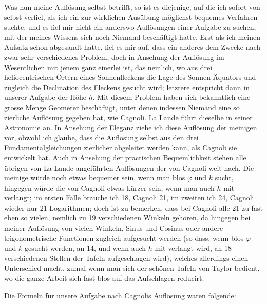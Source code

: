 \documentclass[10pt,a4paper]{article}
\begin{document}
Was nun meine Auflösung selbst betrifft, so ist es diejenige, auf die ich sofort von selbst verfiel, als ich ein zur wirklichen Ausübung möglichst bequemes Verfahren suchte, und es fiel mir nicht ein anderswo Auflösungen einer Aufgabe zu suchen, mit der meines Wissens sich noch Niemand beschäftigt hatte. Erst als ich meinen Aufsatz schon abgesandt hatte, fiel es mir auf, dass ein anderes dem Zwecke nach zwar sehr verschiedenes Problem, doch in Ansehung der Auflösung im Wesentlichen mit jenem ganz einerlei ist, das nemlich, wo aus drei heliocentrischen Örtern eines Sonnenfleckens die Lage des Sonnen-Äquators und zugleich die Declination des Fleckens gesucht wird; letztere entspricht dann in unserer Aufgabe der Höhe $h$. Mit diesem Problem haben sich bekanntlich eine grosse Menge Geometer beschäftigt, unter denen indessen Niemand eine so zierliche Auflösung gegeben hat, wie Cagnoli. La Lande führt dieselbe in seiner Astronomie an. In Ansehung der Eleganz ziehe ich diese Auflösung der meinigen vor, obwohl ich glaube, dass die Auflösung selbst aus den drei Fundamentalgleichungen zierlicher abgeleitet werden kann, als Cagnoli sie entwickelt hat. Auch in Ansehung der practischen Bequemlichkeit stehen alle übrigen von La Lande angeführten Auflösungen der von Cagnoli weit nach. Die meinige würde noch etwas bequemer sein, wenn man blos $\varphi$ und $k$ sucht, hingegen würde die von Cagnoli etwas kürzer sein, wenn man auch $h$ mit verlangt; im ersten Falle brauche ich 18, Cagnoli 21, im zweiten ich 24, Cagnoli wieder nur 21 Logarithmen; doch ist zu bemerken, dass bei Cagnoli alle 21 zu fast eben so vielen, nemlich zu 19 verschiedenen Winkeln gehören, da hingegen bei meiner Auflösung von vielen Winkeln, Sinus und Cosinus oder andere trigonometrische Functionen zugleich aufgesucht werden (so dass, wenn blos $\varphi$ und $k$ gesucht werden, an 14, und wenn auch $h$ mit verlangt wird, an 18 verschiedenen Stellen der Tafeln aufgeschlagen wird), welches allerdings einen Unterschied macht, zumal wenn man sich der schönen Tafeln von Taylor bedient, wo die ganze Arbeit sich fast blos auf das Aufschlagen reducirt.

Die Formeln für unsere Aufgabe nach Cagnolis Auflösung waren folgende:
\end{document}
